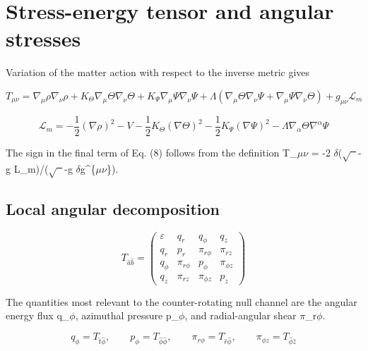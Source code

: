 \documentclass[aps,prd,preprint,nofootinbib,superscriptaddress]{revtex4-2}
\begin{document}
\section{Stress-energy tensor and angular stresses}

Variation of the matter action with respect to the inverse metric gives


\begin{equation}
T_{\mu\nu}=\nabla_\mu\rho\nabla_\nu\rho+K_\Theta\nabla_\mu\Theta\nabla_\nu\Theta+K_\Psi\nabla_\mu\Psi\nabla_\nu\Psi+\Lambda(\nabla_\mu\Theta\nabla_\nu\Psi+\nabla_\mu\Psi\nabla_\nu\Theta)+g_{\mu\nu}\mathcal L_m
\tag{8}\label{eq:8}
\end{equation}

\begin{equation}
\mathcal L_m=-\frac12(\nabla\rho)^2-V-\frac12K_\Theta(\nabla\Theta)^2-\frac12K_\Psi(\nabla\Psi)^2-\Lambda\nabla_\alpha\Theta\nabla^\alpha\Psi
\tag{9}\label{eq:9}
\end{equation}

The sign in the final term of Eq. (8) follows from the definition T\_$\mu$$\nu$ = -2 $\delta$($\sqrt{\phantom{x}}$-g L\_m)/($\sqrt{\phantom{x}}$-g $\delta$g\textasciicircum{}\{$\mu$$\nu$\}).


\subsection{Local angular decomposition}

\begin{equation}
T_{\hat a\hat b}=\begin{pmatrix}\varepsilon&q_r&q_\phi&q_z\\q_r&p_r&\pi_{r\phi}&\pi_{rz}\\q_\phi&\pi_{r\phi}&p_\phi&\pi_{\phi z}\\q_z&\pi_{rz}&\pi_{\phi z}&p_z\end{pmatrix}
\tag{10}\label{eq:10}
\end{equation}

The quantities most relevant to the counter-rotating null channel are the angular energy flux q\_$\phi$, azimuthal pressure p\_$\phi$, and radial-angular shear $\pi$\_r$\phi$.


\begin{equation}
q_\phi=T_{\hat t\hat\phi},\qquad p_\phi=T_{\hat\phi\hat\phi},\qquad \pi_{r\phi}=T_{\hat r\hat\phi},\qquad \pi_{\phi z}=T_{\hat\phi\hat z}
\tag{11}\label{eq:11}
\end{equation}
\end{document}
